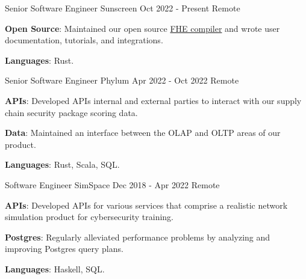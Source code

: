 

\begin{cventries}

  \cventry
    {Senior Software Engineer}
    {Sunscreen}
    {Oct 2022 - Present}
    {Remote}
    {
      \begin{cvitems}
        \item {\color{graytext}\textbf{Open Source}}: Maintained our open source
          \href{https://github.com/Sunscreen-tech/Sunscreen}{FHE compiler} and
          wrote user documentation, tutorials, and integrations.
        \item {\color{graytext}\textbf{Languages}}: Rust.
      \end{cvitems}
    }

  \cventry
    {Senior Software Engineer}
    {Phylum}
    {Apr 2022 - Oct 2022}
    {Remote}
    {
      \begin{cvitems}
        \item {\color{graytext}\textbf{APIs}}: Developed APIs internal and
          external parties to interact with our supply chain security package
          scoring data.
        \item {\color{graytext}\textbf{Data}}: Maintained an interface between the
          OLAP and OLTP areas of our product.
        \item {\color{graytext}\textbf{Languages}}: Rust, Scala, SQL.
      \end{cvitems}
    }


  \longdatecventry
    {Software Engineer}
    {SimSpace}
    {Dec 2018 - Apr 2022}
    {Remote}
    {
      \begin{cvitems}
        \item {\color{graytext}\textbf{APIs}}: Developed APIs for various services
          that comprise a realistic network simulation product for cybersecurity
          training.
        \item {\color{graytext}\textbf{Postgres}}: Regularly alleviated
          performance problems by analyzing and improving Postgres query plans.
        \item {\color{graytext}\textbf{Languages}}: Haskell, SQL.
      \end{cvitems}
    }


\end{cventries}

